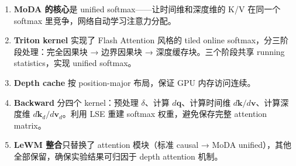 \documentclass[11pt,a4paper]{article}
\begin{document}
\begin{enumerate}
  \item \textbf{MoDA 的核心}是 unified softmax——让时间维和深度维的 K/V 在同一个 softmax 里竞争，网络自动学习注意力分配。
  \item \textbf{Triton kernel} 实现了 Flash Attention 风格的 tiled online softmax，分三阶段处理：完全因果块 → 边界因果块 → 深度缓存块。三个阶段共享 running statistics，实现 unified softmax。
  \item \textbf{Depth cache} 按 position-major 布局，保证 GPU 内存访问连续。
  \item \textbf{Backward} 分四个 kernel：预处理 $\delta$、计算 $d\mathbf{q}$、计算时间维 $d\mathbf{k}/d\mathbf{v}$、计算深度维 $d\mathbf{k}_d/d\mathbf{v}_d$。利用 LSE 重建 softmax 权重，避免保存完整 attention matrix。
  \item \textbf{LeWM 整合}只替换了 attention 模块（标准 causal → MoDA unified），其他全部保留，确保实验结果可归因于 depth attention 机制。
\end{enumerate}
\end{document}
